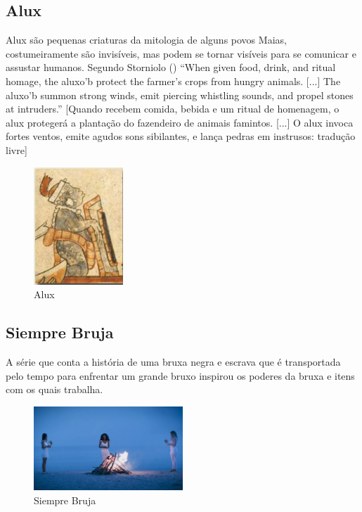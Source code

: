 \subsection{Alux}

Alux são pequenas criaturas da mitologia de alguns povos Maias, costumeiramente são invisíveis, mas podem se tornar visíveis para se comunicar e assustar humanos. Segundo Storniolo (\citeyear{storniolo2009out}) ``When given food, drink, and ritual homage, the aluxo'b protect the farmer’s crops from hungry animals. [...] The aluxo'b summon strong winds, emit piercing whistling sounds, and propel stones at intruders.'' [Quando recebem comida, bebida e um ritual de homenagem, o alux protegerá a plantação do fazendeiro de animais famintos. [...] O alux invoca fortes ventos, emite agudos sons sibilantes, e lança pedras em instrusos: tradução livre]


\begin{figure}[!htb]
	\caption{\label{fig_alux}Alux}
	\begin{center}
	    \includegraphics[width=0.3\textwidth]{imagens/alux.jpg}
	\end{center}
\end{figure}


\vfill
\pagebreak

\subsection{Siempre Bruja}

A série que conta a história de uma bruxa negra e escrava que é transportada  pelo tempo para enfrentar um grande bruxo inspirou os poderes da bruxa e itens com os quais trabalha. 

\begin{figure}[!htb]
	\caption{\label{siempre}Siempre Bruja}
	\begin{center}
	    \includegraphics[width=0.5\textwidth]{imagens/SiempreBruja.jpg}
	\end{center}
\end{figure}


